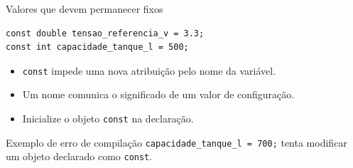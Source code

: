 \begin{frame}[fragile]{Valores que devem permanecer fixos}
\begin{lstlisting}
const double tensao_referencia_v = 3.3;
const int capacidade_tanque_l = 500;
\end{lstlisting}
\begin{itemize}
\item \texttt{const} impede uma nova atribuição pelo nome da variável.
\item Um nome comunica o significado de um valor de configuração.
\item Inicialize o objeto \texttt{const} na declaração.
\end{itemize}
\begin{alertblock}{Exemplo de erro de compilação}
\texttt{capacidade\_tanque\_l = 700;} tenta modificar um objeto declarado como \texttt{const}.
\end{alertblock}
\end{frame}
